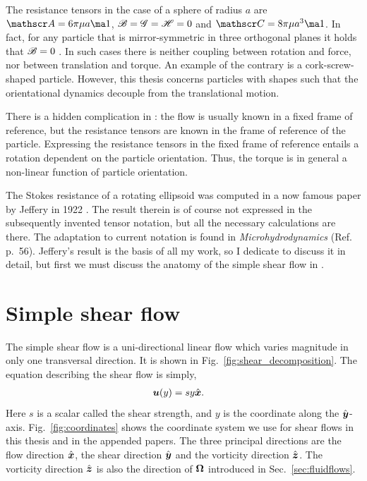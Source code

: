 \documentclass[thesis.tex]{subfiles}
\begin{document}
The resistance tensors in the case of a sphere of radius $a$ are  $\te A = 6\pi\mu a \ma 1$, $\mathscr{B}=\mathscr{G}=\mathscr{H} = 0$ and $\te C = 8\pi\mu a^3 \ma 1$. In fact, for any particle that is mirror-symmetric in three orthogonal planes it holds that $\mathscr{B} = 0$ \cite{brenner1964}. In such cases there is neither coupling between rotation and force, nor between translation and torque. An example of the contrary is a cork-screw-shaped particle.  However, this thesis concerns particles with shapes such that the orientational dynamics decouple from the translational motion.

There is a hidden complication in : the flow is usually known in a fixed frame of reference, but the resistance tensors are known in the frame of reference of the particle. Expressing the resistance tensors in the fixed frame of reference entails a rotation dependent on the particle orientation. Thus, the torque is in general a non-linear function of particle orientation.

The Stokes resistance of a rotating ellipsoid was computed in a now famous paper by Jeffery in 1922 \cite{jeffery1922}. The result therein is of course not expressed in the subsequently invented tensor notation, but all the necessary calculations are there. The adaptation to current notation is found in \emph{Microhydrodynamics} (Ref.~ p.~56). Jeffery's result is the basis of all my work, so I dedicate  to discuss it in detail, but first we must discuss the anatomy of the simple shear flow in .

\section{Simple shear flow}\label{sec:shearflow}

The simple shear flow is a uni-directional linear flow which varies magnitude in only one transversal direction. It is shown in Fig.~\ref{fig:shear_decomposition}. The equation describing the shear flow is simply,
\begin{align}
	\mbox{\boldmath$u$}(y) &= s y \hat{\mbox{\boldmath$x$}}.
\end{align}
Here $s$ is a scalar called the shear strength, and $y$ is the coordinate along the $\hat{\mbox{\boldmath$y$}}$-axis. 
Fig.~\ref{fig:coordinates} shows the coordinate system we use for shear flows in this thesis and in the appended papers. The three principal directions are the flow direction $\hat{\mbox{\boldmath$x$}}$, the shear direction $\hat{\mbox{\boldmath$y$}}$ and the vorticity direction $\hat{\mbox{\boldmath$z$}}$. The vorticity direction $\hat{\mbox{\boldmath$z$}}$ is also the direction of $\mbox{\boldmath$\Omega$}$ introduced in Sec.~\ref{sec:fluidflows}.
\end{document}

